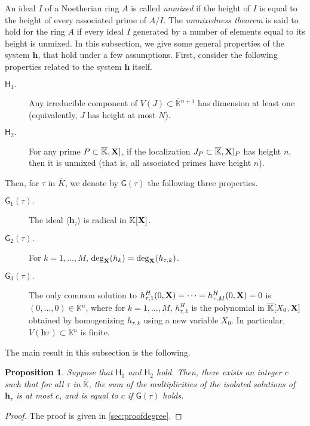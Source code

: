 \documentclass[11pt]{article}
\numberwithin{Property}{section}
\numberwithin{Theorem}{section}
\newtheorem{Proposition}{Proposition}%
\numberwithin{Proposition}{section}
\numberwithin{Lemma}{section}
\numberwithin{Corollary}{section}
\numberwithin{Definition}{section}
\numberwithin{Remark}{section}
\numberwithin{Conjecture}{section}
\numberwithin{Problem}{section}
\numberwithin{Claim}{section}
\theoremstyle{definition}
\numberwithin{Example}{section}
\def\bar{\overline}
\newcommand{\field}{\mathbb{K}} %
\newcommand{\mat}[1]{\mathbf{\MakeUppercase{#1}}} %
\newcommand{\improve}[1]{\textcolor{blue}{#1}} %
\begin{document}
An ideal $I$ of a Noetherian ring $A$ is called \emph{unmixed} if the height of $I$ is equal to the height of every associated prime of $A/I$. The \emph{unmixedness theorem} is said to hold for the ring $A$ if every ideal $I$ generated by a number of elements equal to its height is unmixed. In this subsection, we give some general properties of the system $\mathbf{h}$, that hold under a few assumptions.  First, consider
the following properties related to the system $\mathbf{h}$ itself.
\begin{description}
\item[$\mathsf{H}_1.$] Any irreducible component of $V(J) \subset
  \bar{\field}{}^{n+1}$ has dimension at least one (equivalently, $J$ has
  height at most $N$).
\item[$\mathsf{H}_2.$] For any prime $P \subset\bar{\field},\mat{X}]$, if the
  localization $J_P \subset \bar{\field},\mat{X}]_P$ has height $n$, then it is
  unmixed (that is, all associated primes have height $n$).
\end{description}
Then, for $\tau$ in $\bar{K}$, we denote by $\mathsf{G}(\tau)$ the following three properties.
\begin{description}
\item[$\mathsf{G}_1(\tau).$] The ideal $\langle \mathbf{h}_\tau \rangle$ is radical in $\field[\mat{X}]$.
\item[$\mathsf{G}_2(\tau).$] For $k=1,\dots,M$,
  $\deg_\mat{X}(h_k)=\deg_\mat{X}(h_{\tau,k})$.
\item[$\mathsf{G}_3(\tau).$] The only common solution to $h_{\tau,1}^H(0,\mat{X})=\cdots=h_{\tau,M}^H(0,\mat{X})=0$ is $(0,\dots,0)\in \bar{\field}{}^n$, where for $k=1,\dots,M$, $h_{\tau,k}^H$ is the polynomial in $\bar{\field}[X_0,\mat{X}]$ obtained by homogenizing $h_{\tau,k}$ using a new variable $X_0$. In particular, $V(\mathbf{h}\tau) \subset \field{}^n$ is finite.
\end{description}

The main result in this subsection is the following.
\begin{Proposition}\label{degree_fiber}
Suppose that $\mathsf{H}_1$ and $\mathsf{H}_2$ hold. Then, there exists an integer $c$ such that for all $\tau$ in $\bar{\field}$, the sum of the multiplicities of the isolated solutions of $\mathbf{h}_\tau$ is at most $c$, and is equal to $c$ if $\mathsf{G}(\tau)$ holds.
\end{Proposition}
\begin{proof}
The proof is given in \improve{\cref{sec:proofdegree}}. 
\end{proof}
\end{document}
